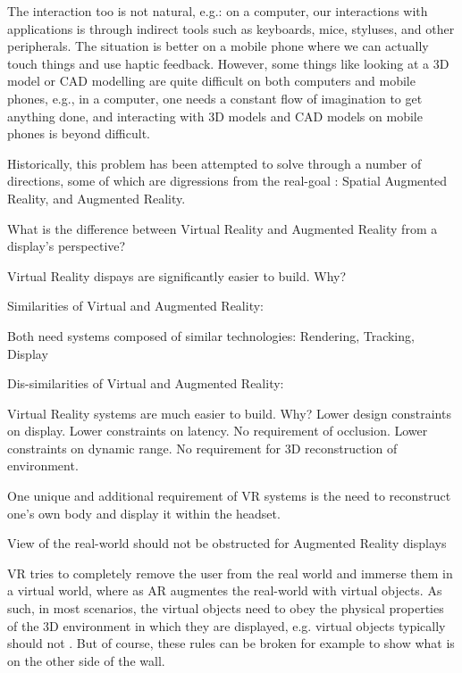 \begin{compact_itemize}
\begin{compact_itemize}
\begin{compact_todolist}
        \item The interaction too is not natural, e.g.: on a computer, our interactions with applications is through indirect tools such as keyboards, mice, styluses, and other peripherals. The situation is better on a mobile phone where we can actually touch things and use haptic feedback. However, some things like looking at a 3D model or CAD modelling are quite difficult on both computers and mobile phones, e.g., in a computer, one needs a constant flow of imagination to get anything done, and interacting with 3D models and CAD models on mobile phones is beyond difficult.
        \item Historically, this problem has been attempted to solve through a number of directions, some of which are digressions from the real-goal : Spatial Augmented Reality, and Augmented Reality.
        \end{compact_todolist}
    \item What is the difference between Virtual Reality and Augmented Reality from a display's perspective?
        \begin{compact_todolist}
        \item Virtual Reality dispays are significantly easier to build. Why?
        \item Similarities of Virtual and Augmented Reality: 
            \begin{compact_todolist}
            \item Both need systems composed of similar technologies: Rendering, Tracking, Display
            \end{compact_todolist}
        \item Dis-similarities of Virtual and Augmented Reality: 
            \begin{compact_todolist}
            \item Virtual Reality systems are much easier to build. Why? Lower design constraints on display. Lower constraints on latency. No requirement of occlusion. Lower constraints on dynamic range. No requirement for 3D reconstruction of environment.
            \item One unique and additional requirement of VR systems is the need to reconstruct one's own body and display it within the headset.
            \item View of the real-world should not be obstructed for Augmented Reality displays
            \item VR tries to completely remove the user from the real world and immerse them in a virtual world, where as AR augmentes the real-world with virtual objects. As such, in most scenarios, the virtual objects need to obey the physical properties of the 3D environment in which they are displayed, e.g. virtual objects typically should not . But of course, these rules can be broken for example to show what is on the other side of the wall. 

\end{compact_todolist}
\end{compact_todolist}
\end{compact_itemize}
\end{compact_itemize}

